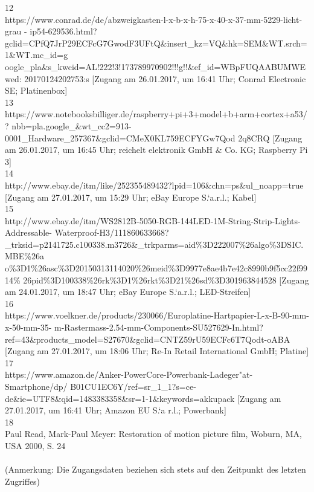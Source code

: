 \documentclass [a4paper, 11pt] {article}
\begin{document}
\begin{sloppypar}
12 \\
https://www.conrad.de/de/abzweigkasten-l-x-b-x-h-75-x-40-x-37-mm-5229-licht-grau \- - ip54-629536.html? gclid=CPfQ7JrP29ECFcG7GwodF3UFtQ\&insert\_kz=VQ\&hk=SEM\&WT.srch=1\&WT.mc\_id=g oogle\_pla\&s\_kwcid=AL!222!3!173789970902!!!g!!\&ef\_id=WBpFUQAABUMWEwed: 20170124202753:s [Zugang am 26.01.2017, um 16:41 Uhr; Conrad Electronic SE; Platinenbox] \\
13\\
https://www.notebooksbilliger.de/raspberry+pi+3+model+b+arm+cortex+a53/? nbb=pla.google\_\&wt\_cc2=913-0001\_Hardware\_257367\&gclid=CMeX0KL759ECFYGw7Qod 2q8CRQ [Zugang am 26.01.2017, um 16:45 Uhr; reichelt elektronik GmbH \& Co. KG; Raspberry Pi 3]\\
14\\
http://www.ebay.de/itm/like/252355489432?lpid=106\&chn=ps\&ul\_noapp=true [Zugang am 27.01.2017, um 15:29 Uhr; eBay Europe S.`a.r.l.; Kabel]\\
15 \\
http://www.ebay.de/itm/WS2812B-5050-RGB-144LED-1M-String-Strip-Lights-Addressable- Waterproof-H3/111860633668? \_trksid=p2141725.c100338.m3726\&\_trkparms=aid\%3D222007\%26algo\%3DSIC.MBE\%26a o\%3D1\%26asc\%3D20150313114020\%26meid\%3D9977e8ae4b7e42c8990b9f5cc22f9914\% 26pid\%3D100338\%26rk\%3D1\%26rkt\%3D21\%26sd\%3D301963844528 [Zugang am 24.01.2017, um 18:47 Uhr; eBay Europe S.`a.r.l.; LED-Streifen] \\
16 \\
https://www.voelkner.de/products/230066/Europlatine-Hartpapier-L-x-B-90-mm-x-50-mm-35- m-Rastermass-2.54-mm-Components-SU527629-In.html? ref=43\&products\_model=S27670\&gclid=CNTZ59rU59ECFc6T7Qodt-oABA [Zugang am 27.01.2017, um 18:06 Uhr; Re-In Retail International GmbH; Platine]\\
17\\
https://www.amazon.de/Anker-PowerCore-Powerbank-Ladeger"at-Smartphone/dp/ B01CU1EC6Y/ref=sr\_1\_1?s=ce- de\&ie=UTF8\&qid=1483383358\&sr=1-1\&keywords=akkupack [Zugang am 27.01.2017, um 16:41 Uhr; Amazon EU S.`a r.l.; Powerbank]\\
18\\
Paul Read, Mark-Paul Meyer: \glqq Restoration of motion picture film\grqq, Woburn, MA, USA 2000, S. 24\\
\\ 
(Anmerkung: Die Zugangsdaten beziehen sich stets auf den Zeitpunkt des letzten Zugriffes)
\end{sloppypar}
\end{document}
